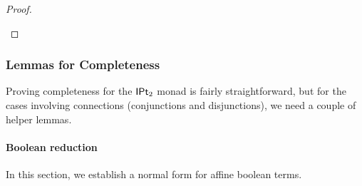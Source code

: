\documentclass[a4paper]{memoir}
\begin{document}
\begin{proof}
\begin{itemize}
%		
	\end{itemize}
\end{proof}

\subsubsection{Lemmas for Completeness} \label{sec:jetcubes:calculus:lemmas}
Proving completeness for the ${\mathsf{IPt}_2}$ monad is fairly straightforward,
but for the cases involving connections (conjunctions and disjunctions), we need a couple of helper lemmas.

\paragraph{Boolean reduction}
In this section, we establish a normal form for affine boolean terms.
\end{document}
